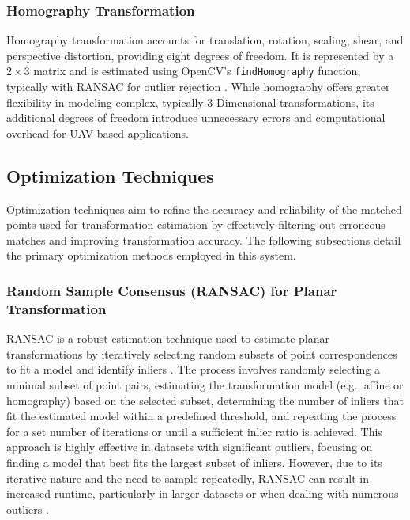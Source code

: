 \subsubsection{Homography Transformation}

Homography transformation accounts for translation, rotation, scaling, shear, and perspective distortion, providing eight degrees of freedom. It is represented by a \(2 \times 3\) matrix and is estimated using OpenCV's \texttt{findHomography} function, typically with RANSAC for outlier rejection \cite{opencv_homography}. While homography offers greater flexibility in modeling complex, typically 3-Dimensional transformations, its additional degrees of freedom introduce unnecessary errors and computational overhead for UAV-based applications. 


\subsection{Optimization Techniques}
\label{sec:Optimization Techniques}

Optimization techniques aim to refine the accuracy and reliability of the matched points used for transformation estimation by effectively filtering out erroneous matches and improving transformation accuracy. The following subsections detail the primary optimization methods employed in this system.

\subsubsection{Random Sample Consensus (RANSAC) for Planar Transformation}

RANSAC is a robust estimation technique used to estimate planar transformations by iteratively selecting random subsets of point correspondences to fit a model and identify inliers \cite{fisher2002ransac}. The process involves randomly selecting a minimal subset of point pairs, estimating the transformation model (e.g., affine or homography) based on the selected subset, determining the number of inliers that fit the estimated model within a predefined threshold, and repeating the process for a set number of iterations or until a sufficient inlier ratio is achieved. This approach is highly effective in datasets with significant outliers, focusing on finding a model that best fits the largest subset of inliers. However, due to its iterative nature and the need to sample repeatedly, RANSAC can result in increased runtime, particularly in larger datasets or when dealing with numerous outliers \cite{fisher2002ransac}.

